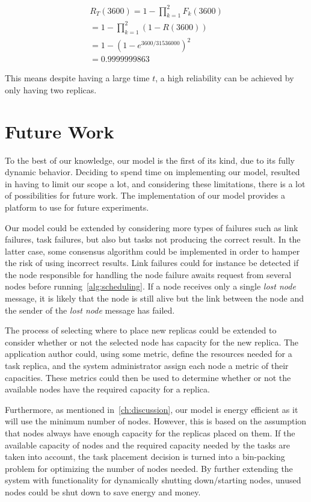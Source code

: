 \documentclass{cslthse-msc}
\begin{document}
\begin{equation*}
\begin{split}
R_{T}(3600) = 1 - \prod\limits_{k=1}^2 F_{k}(3600)\\
= 1 - \prod\limits_{k=1}^2 (1 - R(3600))\\
= 1 - (1 - e^{3600/31536000})^2\\
= 0.9999999863
\end{split}
\end{equation*}

This means despite having a large time $t$, a high reliability can be achieved by only having two replicas. 



\chapter{Future Work} \label{ch:future_work}
To the best of our knowledge, our model is the first of its kind, due to its fully dynamic behavior. Deciding to spend time on implementing our model, resulted in having to limit our scope a lot, and considering these limitations, there is a lot of possibilities for future work. The implementation of our model provides a platform to use for future experiments.

Our model could be extended by considering more types of failures such as link failures, task failures, but also but tasks not producing the correct result. In the latter case, some consensus algorithm could be implemented in order to hamper the risk of using incorrect results. Link failures could for instance be detected if the node responsible for handling the node failure awaits request from several nodes before running~\cref{alg:scheduling}. If a node receives only a single \emph{lost node} message, it is likely that the node is still alive but the link between the node and the sender of the \emph{lost node} message has failed.
 
The process of selecting where to place new replicas could be extended to consider whether or not the selected node has capacity for the new replica. The application author could, using some metric, define the resources needed for a task replica, and the system administrator assign each node a metric of their capacities. These metrics could then be used to determine whether or not the available nodes have the required capacity for a replica.

Furthermore, as mentioned in~\cref{ch:discussion}, our model is energy efficient as it will use the minimum number of nodes. However, this is based on the assumption that nodes always have enough capacity for the replicas placed on them. If the available capacity of nodes and the required capacity needed by the tasks are taken into account, the task placement decision is turned into a bin-packing problem for optimizing the number of nodes needed. By further extending the system with functionality for dynamically shutting down/starting nodes, unused nodes could be shut down to save energy and money.
\end{document}
